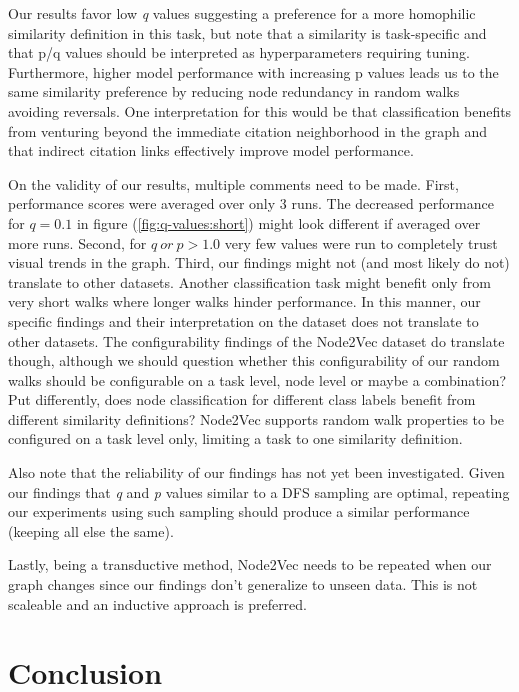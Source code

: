 \documentclass[a4paper,10pt]{article}
\begin{document}
Our results favor low \textit{q} values suggesting a preference for a more homophilic similarity definition in this task, but note that a similarity is task-specific and that p/q values should be interpreted as hyperparameters requiring tuning. Furthermore, higher model performance with increasing p values leads us to the same similarity preference by reducing node redundancy in random walks avoiding reversals. One interpretation for this would be that classification benefits from venturing beyond the immediate citation neighborhood in the graph and that indirect citation links effectively improve model performance.

On the validity of our results, multiple comments need to be made. First, performance scores were averaged over only 3 runs. The decreased performance for $q = 0.1$ in figure (\ref{fig:q-values:short}) might look different if averaged over more runs. Second, for $q \ or \ p > 1.0$ very few values were run to completely trust visual trends in the graph. Third, our findings might not (and most likely do not) translate to other datasets. Another classification task might benefit only from very short walks where longer walks hinder performance. In this manner, our specific findings and their interpretation on the dataset does not translate to other datasets. The configurability findings of the Node2Vec dataset do translate though, although we should question whether this configurability of our random walks should be configurable on a task level, node level or maybe a combination? Put differently, does node classification for different class labels benefit from different similarity definitions? Node2Vec supports random walk properties to be configured on a task level only, limiting a task to one similarity definition.

Also note that the reliability of our findings has not yet been investigated. Given our findings that \textit{q} and \textit{p} values similar to a DFS sampling are optimal, repeating our experiments using such sampling should produce a similar performance (keeping all else the same).

Lastly, being a transductive method, Node2Vec needs to be repeated when our graph changes since our findings don't generalize to unseen data. This is not scaleable and an inductive approach is preferred.

\section{Conclusion}
\end{document}

